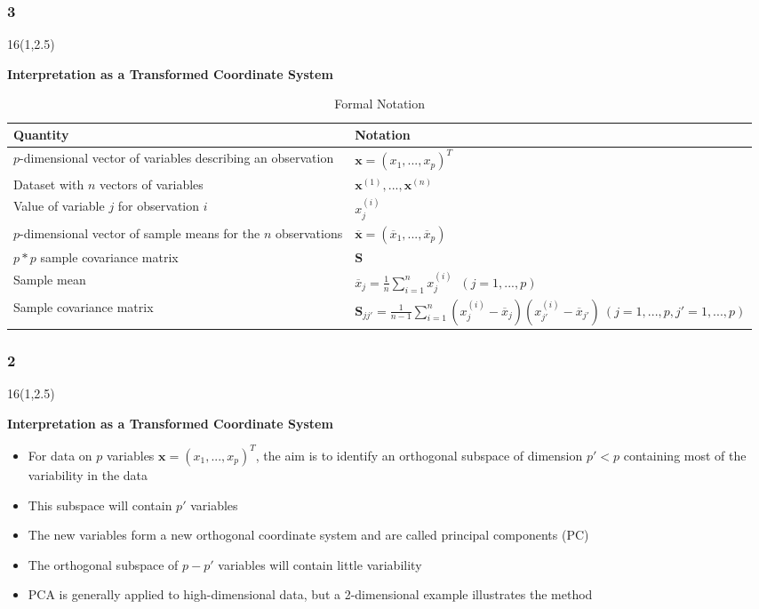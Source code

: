 \documentclass{beamer}
\newcommand\FrameText[1]{
\begin{textblock}{16}(1,2.5)
\raggedright #1
\end{textblock}}
\begin{document}
\begin{frame}
\frametitle{3}
\FrameText{\bf{\large Interpretation as a Transformed Coordinate System}}
\begin{table}[h]
\begin{center}
\begin{tabular}{|p{5.0cm}|p{5.0cm}|}
\hline
\hline
\textbf{Quantity} & \textbf{Notation}\\
\hline
\hline
$p$-dimensional vector of variables describing an observation & $\mathbf{x}=(x_1,...,x_p)^T$ \\
\hline
Dataset with $n$ vectors of variables & $\mathbf{x}^{(1)},...,\mathbf{x}^{(n)}$ \\
\hline
Value of variable $j$ for observation $i$ & $x_j^{(i)}$ \\
\hline
$p$-dimensional vector of sample means for the $n$ observations & $\mathbf{\overline{x}}=(\overline{x}_1,...,\overline{x}_p)$ \\
\hline
$p*p$ sample covariance matrix & $\mathbf{S}$ \\
\hline
Sample mean & $\overline{x}_j=\frac{1}{n}\sum\limits_{i=1}^n x_j^{(i)}\;\;(j=1,...,p)$ \\
\hline
Sample covariance matrix & $\mathbf{S}_{jj'}=\frac{1}{n-1}\sum\limits_{i=1}^n(x_j^{(i)}-\overline{x}_j)(x_{j'}^{(i)}-\overline{x}_{j'})~(j=1,...,p,j'=1,...,p)$\\
\hline
\end{tabular}
\end{center}
\caption{Formal Notation}
\end{table}
\end{frame}

\begin{frame}
\frametitle{2}
\FrameText{\bf{\large Interpretation as a Transformed Coordinate System}}
\begin{itemize}
\item For data on $p$ variables $\mathbf{x}=(x_1,...,x_p)^T$, the aim is to identify an orthogonal subspace of dimension $p'<p$ containing most of the variability in the data
\item This subspace will contain $p'$ variables
\item The new variables form a new orthogonal coordinate system and are called principal components (PC)
\item The orthogonal subspace of $p-p'$ variables will contain little variability
\item PCA is generally applied to high-dimensional data, but a 2-dimensional example illustrates the method
\end{itemize}
\end{frame}
\end{document}

